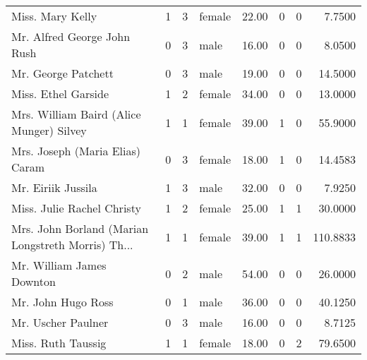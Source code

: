 \begin{tabular}{lrrlrrrr}
Miss. Mary Kelly                                   &         1 &       3 &  female &  22.00 &                        0 &                        0 &    7.7500 \\
Mr. Alfred George John Rush                        &         0 &       3 &    male &  16.00 &                        0 &                        0 &    8.0500 \\
Mr. George Patchett                                &         0 &       3 &    male &  19.00 &                        0 &                        0 &   14.5000 \\
Miss. Ethel Garside                                &         1 &       2 &  female &  34.00 &                        0 &                        0 &   13.0000 \\
Mrs. William Baird (Alice Munger) Silvey           &         1 &       1 &  female &  39.00 &                        1 &                        0 &   55.9000 \\
Mrs. Joseph (Maria Elias) Caram                    &         0 &       3 &  female &  18.00 &                        1 &                        0 &   14.4583 \\
Mr. Eiriik Jussila                                 &         1 &       3 &    male &  32.00 &                        0 &                        0 &    7.9250 \\
Miss. Julie Rachel Christy                         &         1 &       2 &  female &  25.00 &                        1 &                        1 &   30.0000 \\
Mrs. John Borland (Marian Longstreth Morris) Th... &         1 &       1 &  female &  39.00 &                        1 &                        1 &  110.8833 \\
Mr. William James Downton                          &         0 &       2 &    male &  54.00 &                        0 &                        0 &   26.0000 \\
Mr. John Hugo Ross                                 &         0 &       1 &    male &  36.00 &                        0 &                        0 &   40.1250 \\
Mr. Uscher Paulner                                 &         0 &       3 &    male &  16.00 &                        0 &                        0 &    8.7125 \\
Miss. Ruth Taussig                                 &         1 &       1 &  female &  18.00 &                        0 &                        2 &   79.6500 \\

\end{tabular}
